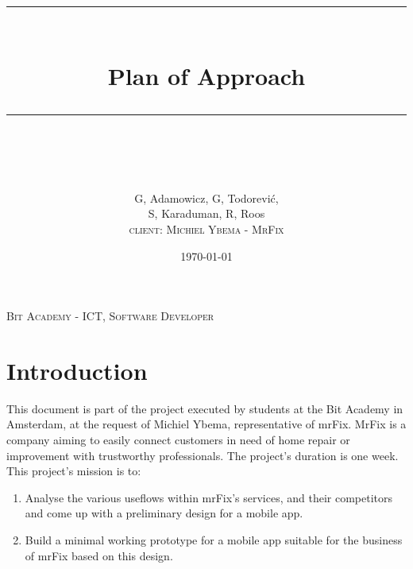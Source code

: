\documentclass[11pt]{article}
\begin{document}
\begin{titlepage}

\author{
    \LARGE G, Adamowicz, G, Todorević, \\
	\LARGE S, Karaduman, R, Roos \\ 
    \textsc{\small client: Michiel Ybema - MrFix} \\
}

\title{
	\vspace{80pt}
	\rule{\linewidth}{0.7pt}\\
	\vspace{7pt}
	\huge{Plan of Approach}\\
	\rule{\linewidth}{0.8pt}\\
	\vspace{30pt}
}

\date{\small \today}

\maketitle

\vspace{\fill}
\normalfont\small
\centering
\textsc{Bit Academy - ICT, Software Developer}\\
\vspace{10pt}

\thispagestyle{empty} %
\end{titlepage}

\tableofcontents
\newpage

\section{Introduction}

This document is part of the project executed by students at the Bit Academy in Amsterdam, 
at the request of Michiel Ybema, representative of mrFix. MrFix is a company aiming to 
easily connect customers in need of home repair or improvement with trustworthy
professionals. The project's duration is one week. This project's mission is to:

\begin{enumerate}
	\item Analyse the various useflows within mrFix's services, and their competitors and 
		come up with a preliminary design for a mobile app.
	\item Build a minimal working prototype for a mobile app suitable for the business of 
		mrFix based on this design.
\end{enumerate}
\end{document}
